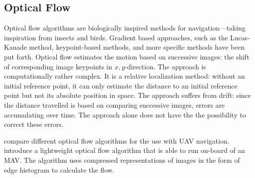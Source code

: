 
\subsection{Optical Flow}
\label{sec:opticalflow}

Optical flow algorithms are biologically inspired methods for navigation---taking inspiration from insects and birds. Gradient based approaches, such as the Lucas-Kanade method, keypoint-based methods, and more specific methods have been put forth.  
Optical flow estimates the motion based on successive images: the shift of corresponding image keypoints in $x,y$-direction.
The approach is computationally rather complex. It is a relative localization method: without an initial reference point, it can only estimate the distance to an initial reference point but not its absolute position in space. The approach suffers from drift: since the distance travelled is based on comparing successive images, errors are accumulating over time. The approach alone does not have the  the possibility to correct these errors.

\citet{chao2013survey} compare different optical flow algorithms for the use with UAV navigation. \citet{mcguire2016local} introduce a lightweight optical flow algorithm that is able to run on-board of an MAV. The algorithm uses compressed representations of images in the form of edge histogram to calculate the flow.   
